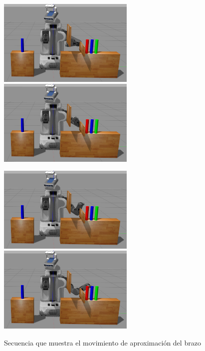 \documentclass[12pt,spanish,chapterprefix, numbers=noenddot]{book}
\numberwithin{equation}{section}
\numberwithin{figure}{section}
\begin{document}
\begin{figure}[hbt!]
\centering
\includegraphics[width=6.5cm]{Figs/frame1632.png}
\includegraphics[width=6.5cm]{Figs/frame1692.png}
\par
\centering
\includegraphics[width=6.5cm]{Figs/frame1791.png}
\includegraphics[width=6.5cm]{Figs/frame1910.png}
\par
\caption{\label{fig:fase4}Secuencia que muestra el movimiento de aproximación del brazo}
\end{figure}
\end{document}
